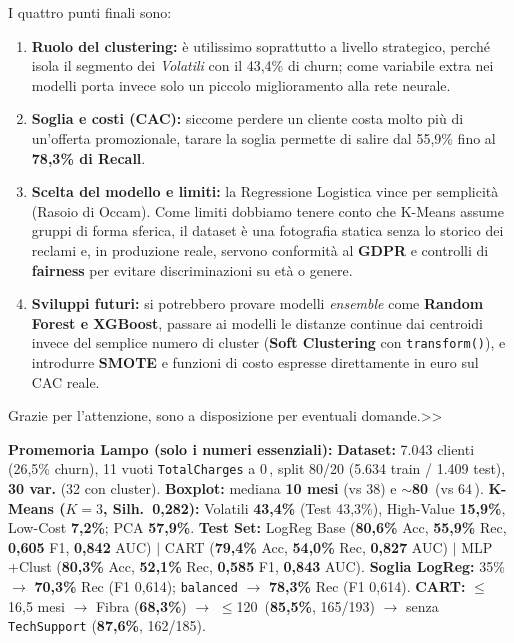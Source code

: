 \documentclass[10pt, a4paper]{article}
\begin{document}
I quattro punti finali sono:
\begin{enumerate}
    \item \textbf{Ruolo del clustering:} è utilissimo soprattutto a livello strategico, perché isola il segmento dei \textit{Volatili} con il 43,4\% di churn; come variabile extra nei modelli porta invece solo un piccolo miglioramento alla rete neurale.
    \item \textbf{Soglia e costi (CAC):} siccome perdere un cliente costa molto più di un'offerta promozionale, tarare la soglia permette di salire dal 55,9\% fino al \textbf{78,3\% di Recall}.
    \item \textbf{Scelta del modello e limiti:} la Regressione Logistica vince per semplicità (Rasoio di Occam). Come limiti dobbiamo tenere conto che K-Means assume gruppi di forma sferica, il dataset è una fotografia statica senza lo storico dei reclami e, in produzione reale, servono conformità al \textbf{GDPR} e controlli di \textbf{fairness} per evitare discriminazioni su età o genere.
    \item \textbf{Sviluppi futuri:} si potrebbero provare modelli \textit{ensemble} come \textbf{Random Forest e XGBoost}, passare ai modelli le distanze continue dai centroidi invece del semplice numero di cluster (\textbf{Soft Clustering} con \texttt{transform()}), e introdurre \textbf{SMOTE} e funzioni di costo espresse direttamente in euro sul CAC reale.
\end{enumerate}
Grazie per l'attenzione, sono a disposizione per eventuali domande.>>

\vspace{3mm}
\noindent\colorbox{LightBg}{\parbox{\dimexpr\linewidth-2\fboxsep}{
\footnotesize
\textbf{\color{PrimaryNavy}Promemoria Lampo (solo i numeri essenziali):}
\textbf{Dataset:} 7.043 clienti (26,5\% churn), 11 vuoti \texttt{TotalCharges} a 0\,\texteuro, split 80/20 (5.634 train / 1.409 test), \textbf{30 var.} (32 con cluster).
\textbf{Boxplot:} mediana \textbf{10 mesi} (vs 38) e \textbf{$\sim$80\,\texteuro} (vs 64\,\texteuro).
\textbf{K-Means ($K=3$, Silh.\ 0,282):} Volatili \textbf{43,4\%} (Test 43,3\%), High-Value \textbf{15,9\%}, Low-Cost \textbf{7,2\%}; PCA \textbf{57,9\%}.
\textbf{Test Set:} LogReg Base (\textbf{80,6\%} Acc, \textbf{55,9\%} Rec, \textbf{0,605} F1, \textbf{0,842} AUC) $|$ CART (\textbf{79,4\%} Acc, \textbf{54,0\%} Rec, \textbf{0,827} AUC) $|$ MLP +Clust (\textbf{80,3\%} Acc, \textbf{52,1\%} Rec, \textbf{0,585} F1, \textbf{0,843} AUC).
\textbf{Soglia LogReg:} 35\% $\rightarrow$ \textbf{70,3\%} Rec (F1 0,614); \texttt{balanced} $\rightarrow$ \textbf{78,3\%} Rec (F1 0,614).
\textbf{CART:} $\le$16,5 mesi $\rightarrow$ Fibra (\textbf{68,3\%}) $\rightarrow$ $\le$120\,\texteuro{} (\textbf{85,5\%}, 165/193) $\rightarrow$ senza \texttt{TechSupport} (\textbf{87,6\%}, 162/185).
}}
\end{document}
